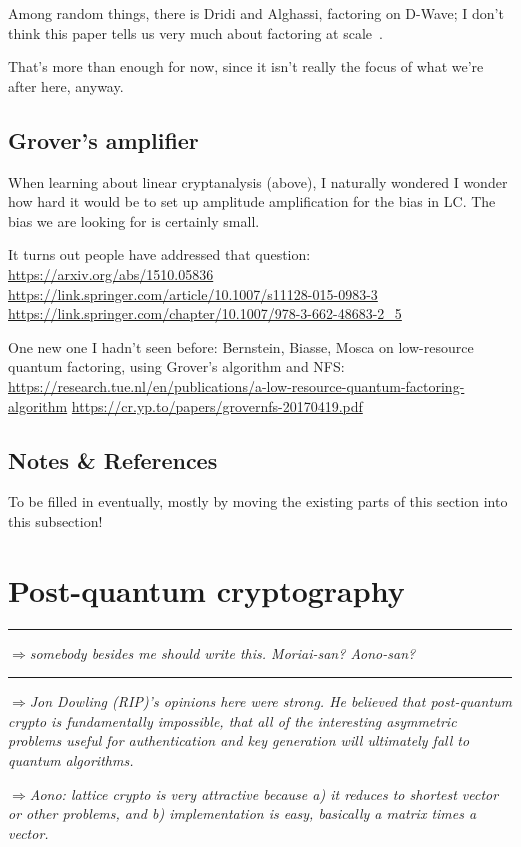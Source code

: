 \documentclass[%
 aip,
 jmp,%
 amsmath,amssymb,
 reprint,%
]{revtex4-1}
\def\outlinecomment#1{\hrule{\color{Blue}$\Rightarrow${\small\em #1}}\hrule}
\def\comment#1{{\color{ForestGreen}$\Rightarrow${\small\em #1}}}
\begin{document}
Among random things, there is Dridi and Alghassi,
factoring on D-Wave; I don’t think this paper tells us very much about factoring at scale~\cite{dridi2017prime}.


That's more than enough for now, since it isn't really the focus of
what we're after here, anyway.

\subsection{Grover's amplifier}

When learning about linear cryptanalysis (above), I naturally wondered
I wonder how hard it would be to set up amplitude amplification for
the bias in LC.  The bias we are looking for is certainly small.

It turns out people have addressed that question:
\url{https://arxiv.org/abs/1510.05836}
\url{https://link.springer.com/article/10.1007/s11128-015-0983-3}
\url{https://link.springer.com/chapter/10.1007/978-3-662-48683-2_5}

One new one I hadn't seen before:
Bernstein, Biasse, Mosca on low-resource quantum factoring, using
Grover's algorithm and NFS:
\url{https://research.tue.nl/en/publications/a-low-resource-quantum-factoring-algorithm}
\url{https://cr.yp.to/papers/grovernfs-20170419.pdf}

\subsection{Notes \& References}

To be filled in eventually, mostly by moving the existing parts of
this section into this subsection!

\section{Post-quantum cryptography}

\outlinecomment{somebody besides me should write this.  Moriai-san?
  Aono-san?}

\comment{Jon Dowling (RIP)'s opinions here were strong.  He believed that
  post-quantum crypto is fundamentally impossible, that all of the
  interesting asymmetric problems useful for authentication and key
  generation will ultimately fall to quantum algorithms.}

\comment{Aono: lattice crypto is very attractive because a) it reduces to
shortest vector or other problems, and b) implementation is easy,
basically a matrix times a vector.}
\end{document}
